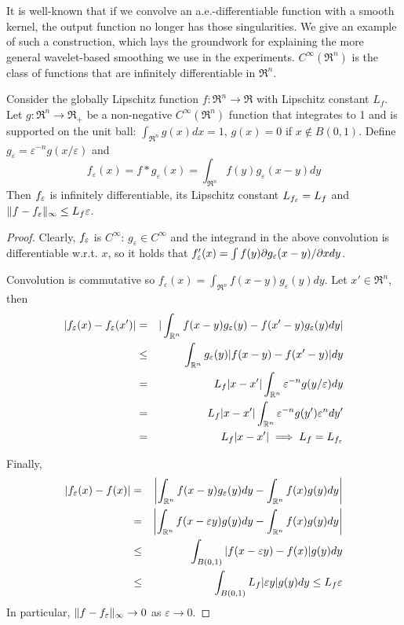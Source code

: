 It is well-known that if we convolve an a.e.-differentiable function with a smooth kernel, the output function no longer has those singularities.
We give an example of such a construction, which lays the groundwork for explaining the more general wavelet-based smoothing we use in the experiments.
$C^\infty(\Re^n)$ is the class of functions that are infinitely differentiable in $\Re^n$.
\begin{theorem}
	\label{thm:ge smoothing}
	Consider the globally Lipschitz function $f:\Re^n \rightarrow \Re$ with Lipschitz constant $L_f$.
	Let $g: \Re^n \rightarrow \Re_+$ be a non-negative $C^\infty(\Re^n)$ function that integrates to 1 and is supported on the unit ball:
	$\int_{\Re^n}g(x)dx = 1$, $g(x) = 0$ if $x \notin B(0,1)$.
	Define $g_\varepsilon = \varepsilon^{-n}g(x/\varepsilon)$ and
	\[f_\varepsilon(x) = f *g_\varepsilon(x) = \int_{\Re^n}f(y)g_\varepsilon(x-y)dy\]
	Then $f_\varepsilon$ is infinitely differentiable, its Lipschitz constant $L_{f_\varepsilon} = L_f$ and $\|f-f_\varepsilon\|_\infty \leq L_f \varepsilon$.
\end{theorem}
\begin{proof}
	Clearly, $f_\varepsilon$ is $C^\infty$: $g_\varepsilon \in C^\infty$ and the integrand in the above convolution is differentiable w.r.t. $x$, so it holds that $f_\varepsilon'(x) = \int{f(y)\partial g_\varepsilon(x-y)/\partial x dy}$.
	
	Convolution is commutative so $f_\varepsilon(x) = \int_{\Re^n}f(x-y)g_\varepsilon(y)dy$.
	Let $x' \in \Re^n$, then 
	\begin{eqnarray*}
	|f_\varepsilon(x)-f_\varepsilon(x')| &=& |\int_{\mathbb{R}^n} f(x-y)g_\varepsilon(y) - f(x'-y)g_\varepsilon(y) dy|
	\\
	&\leq & \int_{\mathbb{R}^n} g_\varepsilon(y)|f(x-y) - f(x'-y)| dy
	\\
	& = & L_f|x-x'| \int_{\mathbb{R}^n} \varepsilon^{-n} g(y/\varepsilon) dy
	\\
	&= &L_f|x-x'| \int_{\mathbb{R}^n} \varepsilon^{-n} g(y') \varepsilon^ndy'
	\\
	&=& L_f|x-x'| \implies L_f = L_{f_\varepsilon}
	\end{eqnarray*}
	
	Finally, 
	\begin{eqnarray*}
	|f_\varepsilon(x)-f(x)| &=& \left|\int_{\mathbb{R}^n}f(x-y)g_\varepsilon(y)dy - \int_{\mathbb{R}^n}f(x)g(y)dy\right|
	\\
	&=& \left|\int_{\mathbb{R}^n}f(x-\varepsilon y)g(y)dy - \int_{\mathbb{R}^n}f(x)g(y)dy\right|
	\\
	&\leq& \int_{B(0,1)}|f(x- \varepsilon y) - f(x)|g(y)dy	
	\\
	&\leq & \int_{B(0,1)}L_f | \varepsilon y| g(y)dy \leq L_f \varepsilon
	\end{eqnarray*}
	In particular, $\|f-f_\varepsilon\|_\infty \rightarrow 0$ as $\varepsilon \rightarrow 0$.
\end{proof}
